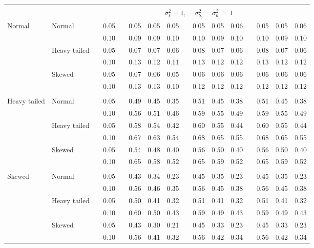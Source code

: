 \documentclass[12pt]{article} %
\begin{document}
\begin{table}[ht]
\begin{scriptsize}
\begin{center}
\begin{tabular}{ll p{.1cm} c p{.1cm} rrr p{.1cm} rrr p{.1cm} rrr}
&&&&&&&&&&&&&&&\\
& && && \multicolumn{9}{c}{$\sigma_{\varepsilon}^2 = 1$, \ \ $\sigma_{b_0}^2 = \sigma_{b_1}^2 = 1$} \\ \cline{6-16}
\rowcolor{gray!20}Normal       & Normal       && 0.05 &&   0.05 & 0.05 & 0.05 && 0.05 & 0.05 & 0.06 && 0.05 & 0.05 & 0.06 \\ 
\rowcolor{gray!20}             &              && 0.10 &&   0.09 & 0.09 & 0.10 && 0.10 & 0.09 & 0.10 && 0.10 & 0.09 & 0.10 \\ 
\rowcolor{gray!20}             & Heavy tailed && 0.05 &&   0.07 & 0.07 & 0.06 && 0.08 & 0.07 & 0.06 && 0.08 & 0.07 & 0.06 \\ 
\rowcolor{gray!20}             &              && 0.10 &&   0.13 & 0.12 & 0.11 && 0.13 & 0.12 & 0.12 && 0.13 & 0.12 & 0.12 \\ 
\rowcolor{gray!20}             & Skewed       && 0.05 &&   0.07 & 0.06 & 0.05 && 0.06 & 0.06 & 0.06 && 0.06 & 0.06 & 0.06 \\ 
\rowcolor{gray!20}             &              && 0.10 &&   0.13 & 0.13 & 0.10 && 0.12 & 0.12 & 0.12 && 0.12 & 0.12 & 0.12 \\ 
             &&&&&&&&&&&&&&&\\
Heavy tailed & Normal       && 0.05 &&   0.49 & 0.45 & 0.35 && 0.51 & 0.45 & 0.38 && 0.51 & 0.45 & 0.38 \\ 
             &              && 0.10 &&   0.56 & 0.51 & 0.46 && 0.59 & 0.55 & 0.49 && 0.59 & 0.55 & 0.49 \\ 
             & Heavy tailed && 0.05 &&   0.58 & 0.54 & 0.42 && 0.60 & 0.55 & 0.44 && 0.60 & 0.55 & 0.44 \\ 
             &              && 0.10 &&   0.67 & 0.63 & 0.54 && 0.68 & 0.65 & 0.55 && 0.68 & 0.65 & 0.55 \\ 
             & Skewed       && 0.05 &&   0.54 & 0.48 & 0.40 && 0.56 & 0.50 & 0.40 && 0.56 & 0.50 & 0.40 \\ 
             &              && 0.10 &&   0.65 & 0.58 & 0.52 && 0.65 & 0.59 & 0.52 && 0.65 & 0.59 & 0.52 \\ 
             &&&&&&&&&&&&&&&\\
Skewed       & Normal       && 0.05 &&   0.43 & 0.34 & 0.23 && 0.45 & 0.35 & 0.23 && 0.45 & 0.35 & 0.23 \\ 
             &              && 0.10 &&   0.56 & 0.46 & 0.35 && 0.56 & 0.45 & 0.38 && 0.56 & 0.45 & 0.38 \\ 
             & Heavy tailed && 0.05 &&   0.50 & 0.41 & 0.32 && 0.51 & 0.41 & 0.32 && 0.51 & 0.41 & 0.32 \\ 
             &              && 0.10 &&   0.60 & 0.50 & 0.43 && 0.59 & 0.49 & 0.43 && 0.59 & 0.49 & 0.43 \\ 
             & Skewed       && 0.05 &&   0.43 & 0.30 & 0.21 && 0.45 & 0.33 & 0.23 && 0.45 & 0.33 & 0.23 \\ 
             &              && 0.10 &&   0.56 & 0.41 & 0.32 && 0.56 & 0.42 & 0.34 && 0.56 & 0.42 & 0.34 \\ 



\end{tabular}
\end{center}
\end{scriptsize}
\end{table}
\end{document}
